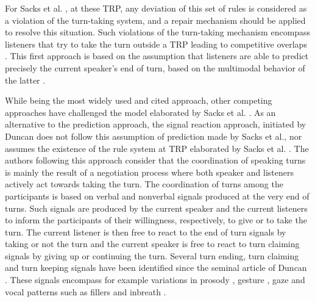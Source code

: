 For Sacks et al. \citep{sacks_simplest_1974}, at these TRP, any deviation of this set of rules is considered
as a violation of the turn-taking system, and a
repair mechanism should be applied to resolve this situation.
Such violations of the turn-taking mechanism
encompass listeners that try to take the turn outside a
TRP leading to competitive overlaps \citep{schegloff_overlapping_2000}.
This first approach is based on the assumption that
listeners are able to predict precisely the current speaker's end of turn, based on the multimodal behavior
of the latter \citep{de_ruiter_projecting_2006,french_turn-competitive_1983,ford_interactional_1996,mondada_multimodal_2007}. 

While being the most widely used and cited approach, other competing approaches have challenged the model elaborated by Sacks et al. \citep{sacks_simplest_1974}.
As an alternative to the prediction approach, the signal reaction approach, initiated by Duncan \citep{duncan_signals_1972} does
not follow this assumption of prediction made by Sacks et al., nor assumes
the existence of the rule system at TRP elaborated by Sacks et al. \citep{sacks_simplest_1974}. The authors following this approach consider
that the coordination of speaking turns is mainly
the result of a negotiation process where both speaker
and listeners actively act towards taking the turn. The
coordination of turns among the participants is based
on verbal and nonverbal signals produced at the very
end of turns. Such signals are produced by the current
speaker and the current listeners to inform the participants
of their willingness, respectively, to give or to take
the turn. The current listener is then free to react to the
end of turn signals by taking or not the turn and the
current speaker is free to react to turn claiming
signals by giving up or continuing the turn. Several turn ending, turn claiming and turn keeping signals have been identified since the seminal article of Duncan \citep{duncan_signals_1972}. These signals encompass for example variations in prosody \citep{duncan_signals_1972,gravano_turn-taking_2011,hjalmarsson_additive_2011}, gesture \citep{duncan_signals_1972,mondada_multimodal_2007}, gaze \citep{kendon_functions_1967,novick_coordinating_1996,oertel_gazeTT_2013} and vocal patterns such as fillers \citep{benus_pragmatic_2011} and inbreath \citep{torreira_planning_2015}.  

